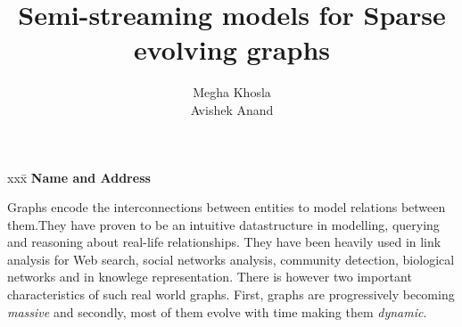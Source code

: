 \documentclass[11pt]{article}
\date{}
\title{Semi-streaming models for Sparse evolving graphs}
\author{Megha Khosla \\
Avishek Anand
}
\begin{document}
\maketitle

\begin{tabbing}
xxx\= \kill
{\bf 
Name and Address
}
\end{tabbing}

\begin{centering}

Graphs encode the interconnections between entities to model relations between them.They have proven to be an intuitive datastructure in modelling, querying and reasoning about real-life relationships. They have been heavily used in link analysis for Web search, social networks analysis, community detection, biological networks and in knowlege representation. There is however two important characteristics of such real world graphs. First, graphs are progressively becoming \emph{massive} and secondly, most of them evolve with time making them \emph{dynamic}. ~\cite{Henzinger,Feigenbaum, Alon}

\end{centering}



\end{document}
